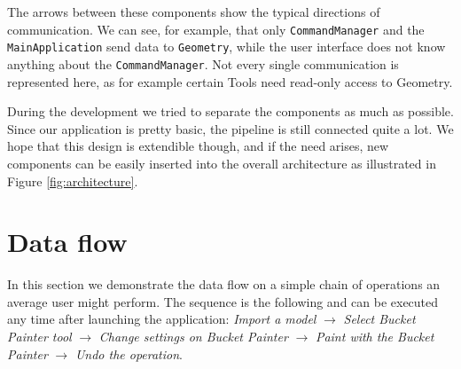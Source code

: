 The arrows between these components show the typical directions of communication. We can see, for example, that only \texttt{CommandManager} and the \texttt{MainApplication} send data to \texttt{Geometry}, while the user interface does not know anything about the \texttt{CommandManager}. Not every single communication is represented here, as for example certain Tools need read-only access to Geometry.

During the development we tried to separate the components as much as possible. Since our application is pretty basic, the pipeline is still connected quite a lot. We hope that this design is extendible though, and if the need arises, new components can be easily inserted into the overall architecture as illustrated in Figure \ref{fig:architecture}.

\section{Data flow}

In this section we demonstrate the data flow on a simple chain of operations an average user might perform. The sequence is the following and can be executed any time after launching the application: \textit{Import a model} $\rightarrow$ \textit{Select Bucket Painter tool} $\rightarrow$ \textit{Change settings on Bucket Painter} $\rightarrow$ \textit{Paint with the Bucket Painter} $\rightarrow$ \textit{Undo the operation}.

